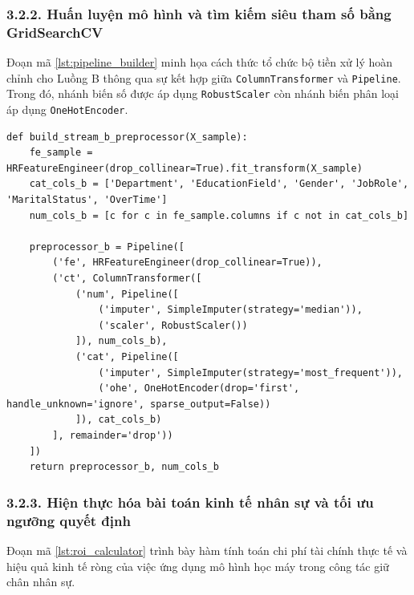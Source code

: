 \documentclass[12pt,a4paper]{article}
\begin{document}
\subsubsection{3.2.2. Huấn luyện mô hình và tìm kiếm siêu tham số bằng GridSearchCV}
Đoạn mã \ref{lst:pipeline_builder} minh họa cách thức tổ chức bộ tiền xử lý hoàn chỉnh cho Luồng B thông qua sự kết hợp giữa \texttt{ColumnTransformer} và \texttt{Pipeline}. Trong đó, nhánh biến số được áp dụng \texttt{RobustScaler} còn nhánh biến phân loại áp dụng \texttt{OneHotEncoder}.

\begin{lstlisting}[caption={Xây dựng Pipeline tiền xử lý hoàn chỉnh cho Luồng B (\texttt{src/preprocessing.py}).}, label={lst:pipeline_builder}]
def build_stream_b_preprocessor(X_sample):
    fe_sample = HRFeatureEngineer(drop_collinear=True).fit_transform(X_sample)
    cat_cols_b = ['Department', 'EducationField', 'Gender', 'JobRole', 'MaritalStatus', 'OverTime']
    num_cols_b = [c for c in fe_sample.columns if c not in cat_cols_b]
    
    preprocessor_b = Pipeline([
        ('fe', HRFeatureEngineer(drop_collinear=True)),
        ('ct', ColumnTransformer([
            ('num', Pipeline([
                ('imputer', SimpleImputer(strategy='median')),
                ('scaler', RobustScaler())
            ]), num_cols_b),
            ('cat', Pipeline([
                ('imputer', SimpleImputer(strategy='most_frequent')),
                ('ohe', OneHotEncoder(drop='first', handle_unknown='ignore', sparse_output=False))
            ]), cat_cols_b)
        ], remainder='drop'))
    ])
    return preprocessor_b, num_cols_b
\end{lstlisting}

\subsubsection{3.2.3. Hiện thực hóa bài toán kinh tế nhân sự và tối ưu ngưỡng quyết định}
Đoạn mã \ref{lst:roi_calculator} trình bày hàm tính toán chi phí tài chính thực tế và hiệu quả kinh tế ròng của việc ứng dụng mô hình học máy trong công tác giữ chân nhân sự.
\end{document}
